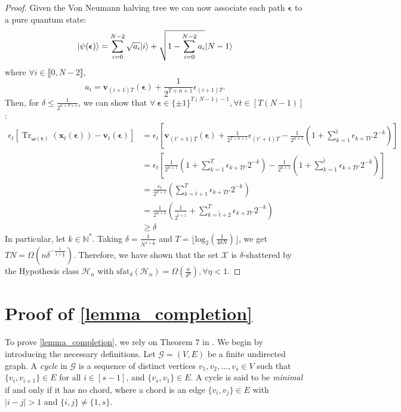 \begin{proof}
Given the Von Neumann halving tree we can now associate each path $\boldsymbol{\epsilon}$ to a pure quantum state:
\begin{equation}
\ket{\psi(\boldsymbol\epsilon)}=\sum_{i=0}^{N-2}\sqrt{a_i}| i \rangle+\sqrt{1-\sum_{i=0}^{N-2}a_i}| N-1 \rangle
\end{equation}
where $\forall i\in\llbracket0,N-2\rrbracket$,
\begin{equation}
    a_i=\mathbf v_{(i+1)T}(\boldsymbol\epsilon)+\frac1{2^{T+n+1}}\epsilon_{(i+1)T}.
\end{equation}
Then, for $\delta\le\frac1{2^{n+T+1}}$, we can show that $\forall \ \boldsymbol{\epsilon} \in \{\pm 1\}^{T(N-1)-1}, \forall t \in [T(N-1)]$:
    \begin{align}
    \label{eq:von_neumann_halving_proof}
        \epsilon_t [\operatorname{Tr}_{\boldsymbol \omega(\boldsymbol \epsilon)}(\mathbf{x}_t(\boldsymbol{\epsilon})) - \mathbf{v}_t (\boldsymbol{\epsilon})] 
        &= \epsilon_t[\mathbf v_{(t'+1)T}(\boldsymbol\epsilon)+\frac1{2^{T+n+1}}\epsilon_{(t'+1)T}-\frac1{2^{n+1}}(1+\sum_{k=1}^{\tilde t}\epsilon_{k+Tt'}2^{-k})]
        \nonumber\\&=\epsilon_t[\frac1{2^{n+1}}(1+\sum_{k=1}^{T}\epsilon_{k+Tt'}2^{-k})-\frac1{2^{n+1}}(1+\sum_{k=1}^{\tilde t}\epsilon_{k+Tt'}2^{-k})]
        \nonumber\\&=\frac{\epsilon_t}{2^{n+1}}(\sum_{k=\tilde t+1}^{T}\epsilon_{k+Tt'}2^{-k})
        \nonumber\\&=\frac{1}{2^{n+1}}(\frac{1}{2^{\tilde t+1}}+\sum_{k=\tilde t+2}^{T}\epsilon_{k+Tt'}2^{-k})
        \nonumber\\&\ge\delta
    \end{align}
In particular, let $k\in\mathbb N^*$. Taking $\delta=\frac1{N^{1+\frac1k}}$ and $T=\lfloor\text{log}_2(\frac1{4\delta N})\rfloor$, we get $TN=\Omega( n\delta^{-\frac1{1+\frac1k}})$. Therefore, we have shown that the set $\mathcal{X}$ is $\delta$-shattered by the Hypothesis class $\mathcal{H}_n$ with $\text{sfat}_\delta(\mathcal H_n)=\Omega(\frac n{\delta^\eta}), \forall\eta<1$.
\end{proof}


\section{Proof of \cref{lemma_completion}}\label{pf:lemma_completion}

To prove \cref{lemma_completion}, we rely on Theorem $7$ in \citet{GRONE1984109}. We begin by introducing the necessary definitions. Let $\mathcal{G}=(V,E)$ be a finite undirected graph. 
A {\it cycle} in $\mathcal{G}$ is a sequence of distinct vertices $v_1, v_2, \dots, v_s\in V$ such that $\{v_i, v_{i+1}\} \in E$ for all $i\in[s-1]$, and $\{v_s, v_1\}\in E$. A cycle is said to be {\it minimal} if and only if it has no chord, where a chord is an edge $\{v_i, v_j\} \in E$ with $|i-j|>1$ and $\{i, j\} \neq \{1, s\}$.

